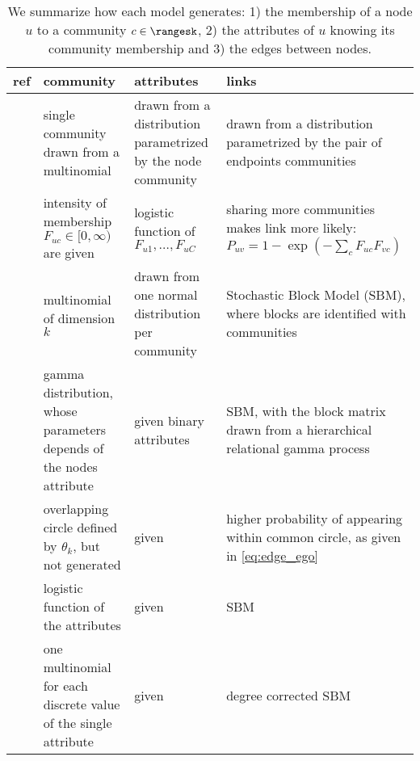 \setlength{\fullpage}{\textwidth+\marginparsep+\marginparwidth}
\begin{table}[htpb]
  \centering
  \small
  \caption{We summarize how each model generates: 1) the membership of a node $u$ to a community $c
  \in \rangesk$, 2) the attributes of $u$ knowing its community membership and 3) the edges between
nodes.}
  \label{tab:edge_genmodel}
  \bgroup
  \def\arraystretch{1.5}
  \begin{tabulary}{\fullpage}{LLLL}
    \toprule
    ref & community & attributes & links \\
    \midrule

    \autocite{Xu2014} &
    single community drawn from a multinomial &
    drawn from a distribution parametrized by the node community &
    drawn from a distribution parametrized by the pair of endpoints communities \\

    \autocite{Yang2013} &
    intensity of membership $F_{uc} \in [0, \infty)$ are given &
    logistic function of $F_{u1},\ldots,F_{uC}$ &
    sharing more communities makes link more likely:
    $P_{uv} = 1-\exp(-\sum_c F_{uc}F_{vc})$ \\

    \autocite{Kataoka2016} &
    multinomial of dimension $k$ &
    drawn from one normal distribution per community &
    Stochastic Block Model (SBM), where blocks are identified with communities \\

    \midrule

    \autocite{Zhao2017} &
    gamma distribution, whose parameters depends of the nodes attribute &
    given binary attributes &
    SBM, with the block matrix drawn from a hierarchical relational gamma process \\

    \autocites{LeskovecEgo12}{LeskovecEgo14} &
    overlapping circle defined by $\theta_k$, but not generated &
    given &
    higher probability of appearing within common circle, as given in \eqref{eq:edge_ego} \\

    \autocite{Weng2016} &
    logistic function of the attributes &
    given &
    SBM \\

    \autocite{Newman2016} &
    one multinomial for each discrete value of the single attribute &
    given &
    degree corrected SBM \\
    \bottomrule
  \end{tabulary}
  \egroup
\end{table}

